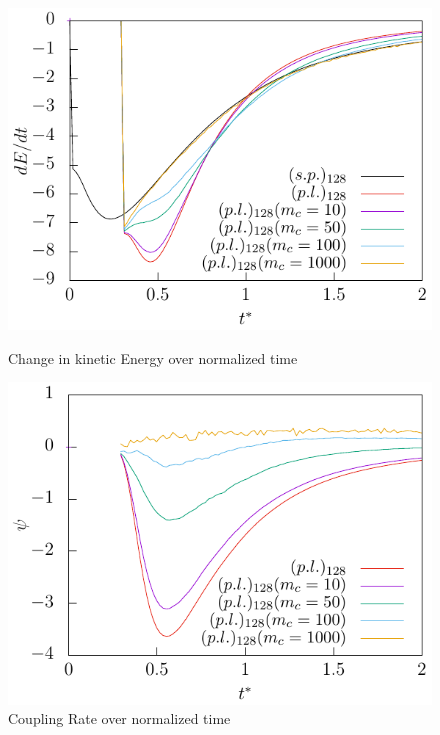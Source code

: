 \documentclass[a4paper,12pt]{article}
\numberwithin{equation}{section} %
\begin{document}
\begin{figure}[h]
    \centering
    \begin{minipage}{.5\textwidth}
        \centering
        \includegraphics[width=\linewidth]{./../Simulationsergebnisse/variationWolken/128/der(kineticEnergy)_time.pdf}
        \caption{Change in kinetic Energy over normalized time}
        \label{der(kineticEnergy)_time_128}
    \end{minipage}%
    \begin{minipage}{0.5\textwidth}
        \centering
        \includegraphics[width=\linewidth]{./../Simulationsergebnisse/variationWolken/128/coupling_time.pdf}
        \caption{Coupling Rate over normalized time}
        \label{coupling_time_128}
    \end{minipage}
\end{figure}
\end{document}
